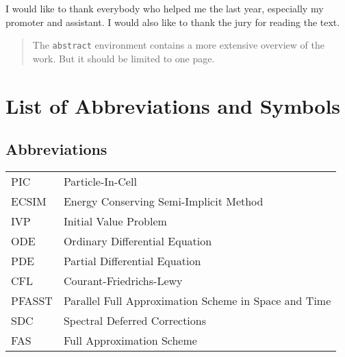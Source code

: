 \documentclass[master=wit, english]{kulemt}
\begin{document}
\begin{preface}
  I would like to thank everybody who helped me the last year,
  especially my promoter and assistant. I would also like to thank the
  jury for reading the text. 
\end{preface}

\tableofcontents*

\begin{abstract}
  The \texttt{abstract} environment contains a more extensive overview of
  the work. But it should be limited to one page.

  \lipsum[1]
\end{abstract}

\listoffiguresandtables
\chapter{List of Abbreviations and Symbols}
\section*{Abbreviations}
\begin{flushleft}
  \renewcommand{\arraystretch}{1.1}
  \begin{tabularx}{\textwidth}{@{}p{12mm}X@{}}
  	PIC & Particle-In-Cell\\
    ECSIM   & Energy Conserving Semi-Implicit Method \cite{lapenta_exactly_2017}\\
    IVP & Initial Value Problem\\
    ODE & Ordinary Differential Equation\\
    PDE & Partial Differential Equation\\
    CFL  & Courant-Friedrichs-Lewy \cite{courant_uber_1928} \\
    PFASST   & Parallel Full Approximation Scheme in Space and Time \cite{emmett_toward_2012}\\
    SDC & Spectral Deferred Corrections \cite{dutt_spectral_2000}\\
    FAS & Full Approximation Scheme \cite{brandt_multi-level_1976} \\
  \end{tabularx}
\end{flushleft}
\end{document}
